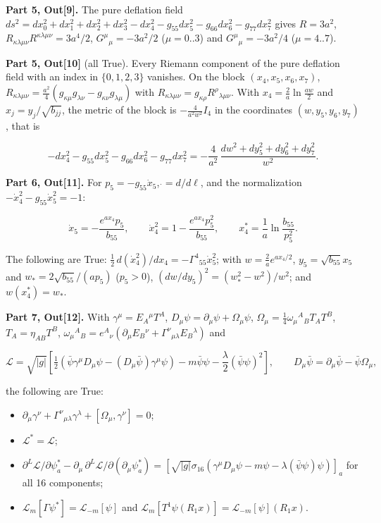 \documentclass[10pt]{article}
\makeatletter
\newcommand\keepnext{\par\nopagebreak\@nobreaktrue\everypar{\@nobreakfalse\everypar{}}}
\makeatother
\begin{document}
\textbf{Part 5, Out[9].} The pure deflation field $ds^2 = dx_0^2 + dx_1^2 + dx_2^2 + dx_3^2 - dx_4^2 - g_{55}dx_5^2 - g_{66}dx_6^2 - g_{77}dx_7^2$ gives $R = 3a^2$, $R_{\kappa\lambda\mu\nu}R^{\kappa\lambda\mu\nu} = 3a^4/2$, $G^\mu{}_\mu = -3a^2/2$ ($\mu = 0..3$) and $G^\mu{}_\mu = -3a^2/4$ ($\mu = 4..7$).


\textbf{Part 5, Out[10]} (all True). Every Riemann component of the pure deflation field with an index in $\{0,1,2,3\}$ vanishes. On the block $(x_4, x_5, x_6, x_7)$, $R_{\kappa\lambda\mu\nu} = \frac{a^2}{4}(g_{\kappa\mu}g_{\lambda\nu} - g_{\kappa\nu}g_{\lambda\mu})$ with $R_{\kappa\lambda\mu\nu} = g_{\kappa\rho}R^\rho{}_{\lambda\mu\nu}$. With $x_4 = \frac2a\ln\frac{aw}{2}$ and $x_j = y_j/\sqrt{b_{jj}}$, the metric of the block is $-\frac{4}{a^2w^2}I_4$ in the coordinates $(w, y_5, y_6, y_7)$, that is\keepnext


\[
-dx_4^2 - g_{55}dx_5^2 - g_{66}dx_6^2 - g_{77}dx_7^2 = -\frac{4}{a^2}\,\frac{dw^2 + dy_5^2 + dy_6^2 + dy_7^2}{w^2} .
\]

\textbf{Part 6, Out[11].} For $p_5 = -g_{55}\dot x_5$, $\dot{} = d/d\ell$, and the normalization $-\dot x_4^2 - g_{55}\dot x_5^2 = -1$:\keepnext


\[
\dot x_5 = -\frac{e^{ax_4}p_5}{b_{55}}, \qquad \dot x_4^2 = 1 - \frac{e^{ax_4}p_5^2}{b_{55}}, \qquad x_4^* = \frac1a\ln\frac{b_{55}}{p_5^2} .
\]

The following are True: $\frac12\,d(\dot x_4^2)/dx_4 = -\Gamma^4{}_{55}\dot x_5^2$; with $w = \frac2a e^{ax_4/2}$, $y_5 = \sqrt{b_{55}}x_5$ and $w_* = 2\sqrt{b_{55}}/(ap_5)$ ($p_5 > 0$), $(dw/dy_5)^2 = (w_*^2 - w^2)/w^2$; and $w(x_4^*) = w_*$.


\textbf{Part 7, Out[12].} With $\gamma^\mu = E_A{}^\mu T^A$, $D_\mu\psi = \partial_\mu\psi + \Omega_\mu\psi$, $\Omega_\mu = \frac14\omega_\mu{}^A{}_BT_AT^B$, $T_A = \eta_{AB}T^B$, $\omega_\mu{}^A{}_B = e^A{}_\nu(\partial_\mu E_B{}^\nu + \Gamma^\nu{}_{\mu\lambda}E_B{}^\lambda)$ and\keepnext


\[
\mathcal L = \sqrt{\lvert g\rvert}\left[\tfrac12\left(\bar\psi\gamma^\mu D_\mu\psi - (D_\mu\bar\psi)\gamma^\mu\psi\right) - m\bar\psi\psi - \frac\lambda2(\bar\psi\psi)^2\right], \qquad D_\mu\bar\psi = \partial_\mu\bar\psi - \bar\psi\Omega_\mu ,
\]

the following are True:\keepnext

\begin{itemize}
\item $\partial_\mu\gamma^\nu + \Gamma^\nu{}_{\mu\lambda}\gamma^\lambda + [\Omega_\mu, \gamma^\nu] = 0$;
\item $\mathcal L^* = \mathcal L$;
\item $\partial^L\mathcal L/\partial\psi_a^* - \partial_\mu\,\partial^L\mathcal L/\partial(\partial_\mu\psi_a^*) = \left[\sqrt{\lvert g\rvert}\sigma_{16}(\gamma^\mu D_\mu\psi - m\psi - \lambda(\bar\psi\psi)\psi)\right]_a$ for all 16 components;
\item $\mathcal L_m[\Gamma\psi^*] = \mathcal L_{-m}[\psi]$ and $\mathcal L_m[T^1\psi(R_1x)] = \mathcal L_{-m}[\psi](R_1x)$.
\end{itemize}
\end{document}
